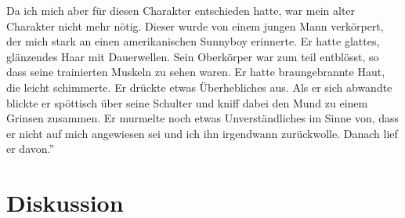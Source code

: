 {Da ich mich aber für diesen Charakter entschieden hatte, war mein alter Charakter nicht mehr nötig. Dieser wurde von einem jungen Mann verkörpert, der mich stark an einen amerikanischen Sunnyboy erinnerte. Er hatte glattes, glänzendes Haar mit Dauerwellen. Sein Oberkörper war zum teil entblösst, so dass seine trainierten Muskeln zu sehen waren. Er hatte braungebrannte Haut, die leicht schimmerte. Er drückte etwas Überhebliches aus. Als er sich abwandte blickte er spöttisch über seine Schulter und kniff dabei den Mund zu einem Grinsen zusammen. Er murmelte noch etwas Unverständliches im Sinne von, dass er nicht auf mich angewiesen sei und ich ihn irgendwann zurückwolle. Danach lief er davon.\textquotedblright}
\section*{Diskussion}\label{section.diskussion}




